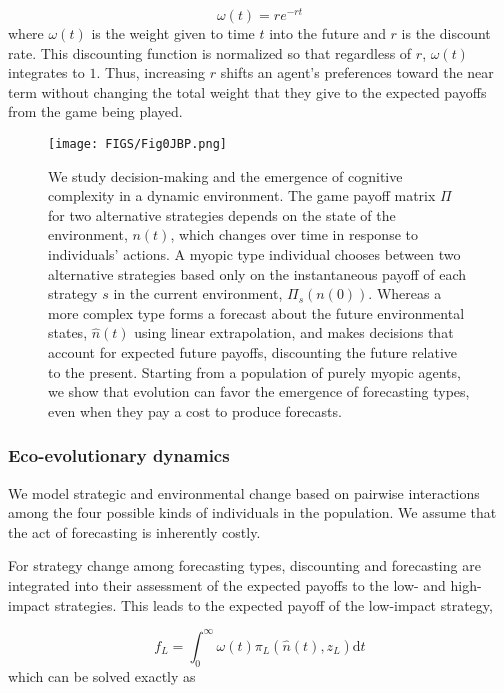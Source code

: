 \documentclass{article}
\begin{document}
\begin{equation}
    \omega(t)=re^{-rt}
\end{equation}
where $\omega(t)$ is the weight given to time $t$ into the future and $r$ is the discount rate. This discounting function is normalized so that regardless of $r$, $\omega(t)$ integrates to $1$. Thus, increasing $r$ shifts an agent's preferences toward the near term without changing the total weight that they give to the expected payoffs from the game being played.
\begin{figure}
    \centering
    \texttt{[image: FIGS/Fig0JBP.png]}
    \caption{We study decision-making and the emergence of cognitive complexity in a dynamic environment. The game payoff matrix $\Pi$ for two alternative strategies depends on the state of the environment, $n(t)$, which changes over time in response to individuals' actions. A myopic type individual chooses between two alternative strategies based only on the instantaneous payoff of each strategy $s$ in the current environment, $\Pi_s(n(0))$. Whereas a more complex type forms a forecast about the future environmental states, $\hat{n}(t)$ using linear extrapolation, and makes decisions that account for expected future payoffs, discounting the future relative to the present. Starting from a population of purely myopic agents, we show that evolution can favor the emergence of forecasting types, even when they pay a cost to produce forecasts.}
    \label{conceptual}
\end{figure}



\subsubsection*{Eco-evolutionary dynamics}
We model strategic and environmental change based on pairwise interactions among the four possible kinds of individuals in the population. We assume that the act of forecasting is inherently costly. 

For strategy change among forecasting types, discounting and forecasting are integrated into their assessment of the expected payoffs to the low- and high-impact strategies. This leads to the expected payoff of the low-impact strategy,

\begin{equation}
    f_L = \int_0^\infty \omega(t)\pi_L(\hat{n}(t),z_L) \mathrm{d}t
\end{equation}
which can be solved exactly as
\end{document}
